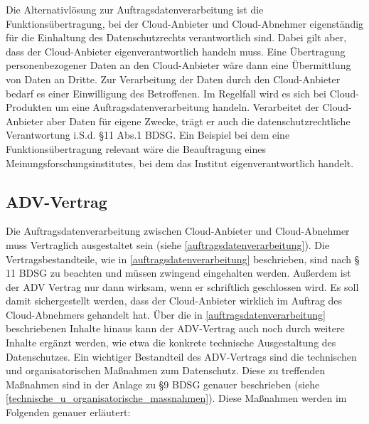 Die Alternativl\"osung zur Auftragsdatenverarbeitung ist die Funktions\"ubertragung, bei der Cloud-Anbieter und Cloud-Abnehmer eigenst\"andig f\"ur die Einhaltung des Datenschutzrechts verantwortlich sind. Dabei gilt aber, dass der Cloud-Anbieter eigenverantwortlich handeln muss. Eine \"Ubertragung personenbezogener Daten an den Cloud-Anbieter w\"are dann eine \"Ubermittlung von Daten an Dritte. Zur Verarbeitung der Daten durch den Cloud-Anbieter bedarf es einer Einwilligung des Betroffenen.\newline 
Im Regelfall wird es sich bei Cloud-Produkten um eine Auftragsdatenverarbeitung handeln. Verarbeitet der Cloud-Anbieter aber Daten f\"ur eigene Zwecke, tr\"agt er auch die datenschutzrechtliche Verantwortung i.S.d. §11 Abs.1 BDSG. Ein Beispiel bei dem eine Funktions\"ubertragung relevant w\"are die Beauftragung eines Meinungsforschungsinstitutes, bei dem das Institut eigenverantwortlich handelt. 
 \subsection{ADV-Vertrag}
Die Auftragsdatenverarbeitung zwischen Cloud-Anbieter und Cloud-Abnehmer muss Vertraglich ausgestaltet sein (siehe \vref{auftragsdatenverarbeitung}). Die Vertragsbestandteile, wie in \vref{auftragsdatenverarbeitung} beschrieben, sind nach § 11 BDSG zu beachten und m\"ussen zwingend eingehalten werden.\newline
Au{\ss}erdem ist der ADV Vertrag nur dann wirksam, wenn er schriftlich geschlossen wird. Es soll damit sichergestellt werden, dass der Cloud-Anbieter wirklich im Auftrag des Cloud-Abnehmers gehandelt hat. \"Uber die in \vref{auftragsdatenverarbeitung} beschriebenen Inhalte hinaus kann der ADV-Vertrag auch noch durch weitere Inhalte erg\"anzt werden, wie etwa die konkrete technische Ausgestaltung des Datenschutzes.\newline
Ein wichtiger Bestandteil des ADV-Vertrags sind die technischen und organisatorischen Ma{\ss}nahmen zum Datenschutz. Diese zu treffenden Ma{\ss}nahmen sind in der Anlage zu §9 BDSG genauer beschrieben (siehe \vref{technische_u_organisatorische_massnahmen}).  Diese Ma{\ss}nahmen werden im Folgenden genauer erl\"autert: 

